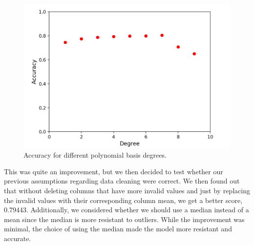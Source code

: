 \documentclass[10pt,conference,compsocconf]{IEEEtran}
\begin{document}

\begin{figure}[h]
  \centering
  \includegraphics[width=0.9\columnwidth]{polynomial_basis_degrees}
  \caption{Accuracy for different polynomial basis degrees.}
  \vspace{-3mm}
\end{figure}

This was quite an improvement, but we then decided to test whether our previous assumptions regarding data cleaning were correct. We then found out that without deleting columns that have more invalid values and just by replacing the invalid values with their corresponding column mean, we get a better score, 0.79443. Additionally, we considered whether we should use a median instead of a mean since the median is more resistant to outliers. While the improvement was minimal, the choice of using the median made the model more resistant and accurate.
\end{document}
